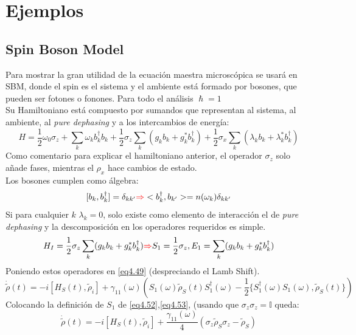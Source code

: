 \documentclass{book}
\begin{document}
\section{Ejemplos}
\subsection{Spin Boson Model}
Para mostrar la gran utilidad de la ecuación maestra microscópica se usará en SBM, donde el spin es el sistema y el ambiente está formado por bosones, que pueden ser fotones o fonones. Para todo el análisis $\hslash=1$\\

Su Hamiltoniano está compuesto por sumandos que representan al sistema, al ambiente, al \textit{pure dephasing} y a los intercambios de energía:
\begin{equation}\label{eq4.50}H=\frac{1}{2}\omega_0\sigma_z+\sum_k\omega_kb_k^\dag b_k+\frac{1}{2}\sigma_z\sum_k(g_kb_k+g_k^*b_k^\dag)+\frac{1}{2}\sigma_x\sum_k(\lambda_k b_k+\lambda_k^*b_k^\dag)\end{equation}
Como comentario para explicar el hamiltoniano anterior, el operador $\sigma_z$ solo añade fases, mientras el $\rho_x$ hace cambios de estado.\\ Los bosones cumplen como álgebra: \begin{equation}\label{eq4.51}[b_k,b_k^\dag]=\delta_{kk^\prime}\textcolor{red}{\Rightarrow} <b_k^\dag,b_{k^\prime}>=n(\omega_k)\delta_{kk^\prime}\end{equation}
 Si para cualquier $k$ $\lambda_k=0$, solo existe como elemento de interacción el de \textit{pure dephasing} y la descomposición en los operadores requeridos es simple.
 \begin{equation}\label{eq4.52}H_I=\frac{1}{2}\sigma_z\sum_k(g_kb_k+g_k^*b_k^\dag)\textcolor{red}{\Rightarrow} S_1=\frac{1}{2}\sigma_z, E_1=\sum_k(g_kb_k+g_k^*b_k^\dag) \end{equation}
 Poniendo estos operadores en \ref{eq4.49} (despreciando el Lamb Shift).
 \begin{equation}\label{eq4.53}\dot{\tilde{\rho}}(t)=-i[H_S(t),\tilde{\rho}_i]+\gamma_{11}(\omega)(S_1(\omega)\tilde{\rho}_S(t)S_1^\dag(\omega)-\frac{1}{2}\{S_1^\dag(\omega)S_1(\omega),\tilde{\rho}_S(t)\})\end{equation} 
Colocando la definición de $S_1$ de \ref{eq4.52},\ref{eq4.53}, (usando que $\sigma_z\sigma_z=\mathbb{I}$ queda:
 \begin{equation}\label{eq4.54}\dot{\tilde{\rho}}(t)=-i[H_S(t),\tilde{\rho}_i]+\frac{\gamma_{11}(\omega)}{4}(\sigma_z\tilde{\rho}_S\sigma_z-\tilde{\rho}_S)\end{equation} 
\end{document}
